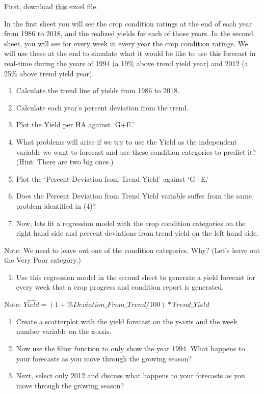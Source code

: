\documentclass[
]{book}
\providecommand{\tightlist}{%
  \setlength{\itemsep}{0pt}\setlength{\parskip}{0pt}}
\begin{document}
First, download \href{Excel-files/yied-forecast-advanced.xlsx}{this} excel file.

In the first sheet you will see the crop condition ratings at the end of each year from 1986 to 2018, and the realized yields for each of those years. In the second sheet, you will see for every week in every year the crop condition ratings. We will use these at the end to simulate what it would be like to use this forecast in real-time during the years of 1994 (a 19\% above trend yield year) and 2012 (a 25\% above trend yield year).

\begin{enumerate}
\def\labelenumi{\arabic{enumi}.}
\tightlist
\item
  Calculate the trend line of yields from 1986 to 2018.
\item
  Calculate each year's percent deviation from the trend.
\item
  Plot the Yield per HA against `G+E.'
\item
  What problems will arise if we try to use the Yield as the independent variable we want to forecast and use these condition categories to predict it? (Hint: There are two big ones.)
\item
  Plot the `Percent Deviation from Trend Yield' against `G+E.'
\item
  Does the Percent Deviation from Trend Yield variable suffer from the same problem identified in (4)?
\item
  Now, lets fit a regression model with the crop condition categories on the right hand side and percent deviations from trend yield on the left hand side.
\end{enumerate}

Note: We need to leave out one of the condition categories. Why? (Let's leave out the Very Poor category.)

\begin{enumerate}
\def\labelenumi{\arabic{enumi}.}
\setcounter{enumi}{7}
\tightlist
\item
  Use this regression model in the second sheet to generate a yield forecast for every week that a crop progress and condition report is generated.
\end{enumerate}

Note: \(\hat{Yield}=(1+\%Deviation\_From\_Trend/100)*Trend\_Yield\)

\begin{enumerate}
\def\labelenumi{\arabic{enumi}.}
\setcounter{enumi}{8}
\item
  Create a scatterplot with the yield forecast on the y-axis and the week number variable on the x-axis.
\item
  Now use the filter function to only show the year 1994. What happens to your forecasts as you move through the growing season?
\item
  Next, select only 2012 and discuss what happens to your forecasts as you move through the growing season?
\end{enumerate}
\end{document}
